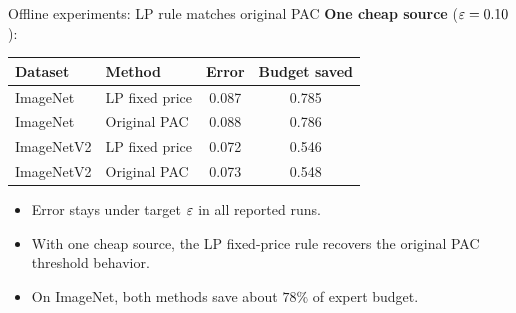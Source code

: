 \begin{frame}{Offline experiments: LP rule matches original PAC}
  \small
  \textbf{One cheap source} (\(\varepsilon=0.10\)):
  \begin{table}
  \centering
  \begin{tabular}{llcc}
    \toprule
    Dataset & Method & Error & Budget saved \\
    \midrule
    ImageNet   & LP fixed price & 0.087 & 0.785 \\
    ImageNet   & Original PAC   & 0.088 & 0.786 \\
    ImageNetV2 & LP fixed price & 0.072 & 0.546 \\
    ImageNetV2 & Original PAC   & 0.073 & 0.548 \\
    \bottomrule
  \end{tabular}
  \end{table}
  \begin{itemize}
    \item Error stays under target \(\varepsilon\) in all reported runs.
    \item With one cheap source, the LP fixed-price rule recovers the original
          PAC threshold behavior.
    \item On ImageNet, both methods save about \(78\%\) of expert budget.
  \end{itemize}
\end{frame}

